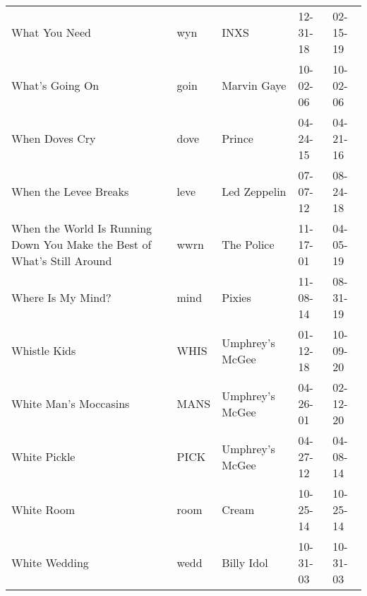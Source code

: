 \begin{longtable}{p{}p{}p{}p{}p{}}
                                                           What You Need &           wyn &                                                     INXS &              12-31-18 &             02-15-19 \\
                                                         What's Going On &          goin &                                              Marvin Gaye &              10-02-06 &             10-02-06 \\
                                                          When Doves Cry &          dove &                                                   Prince &              04-24-15 &             04-21-16 \\
                                                   When the Levee Breaks &          leve &                                             Led Zeppelin &              07-07-12 &             08-24-18 \\
 When the World Is Running Down You Make the Best of What's Still Around &          wwrn &                                               The Police &              11-17-01 &             04-05-19 \\
                                                       Where Is My Mind? &          mind &                                                   Pixies &              11-08-14 &             08-31-19 \\
                                                            Whistle Kids &          WHIS &                                          Umphrey's McGee &              01-12-18 &             10-09-20 \\
                                                   White Man's Moccasins &          MANS &                                          Umphrey's McGee &              04-26-01 &             02-12-20 \\
                                                            White Pickle &          PICK &                                          Umphrey's McGee &              04-27-12 &             04-08-14 \\
                                                              White Room &          room &                                                    Cream &              10-25-14 &             10-25-14 \\
                                                           White Wedding &          wedd &                                               Billy Idol &              10-31-03 &             10-31-03 \\

\end{longtable}
